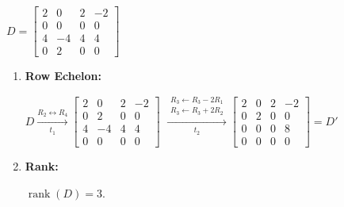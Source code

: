 $D=
\begin{bmatrix}
    2 & 0 & 2 & -2 \\
    0 & 0 & 0 & 0 \\
    4 & -4 & 4 & 4 \\
    0 & 2 & 0 & 0
\end{bmatrix}
$ \\[1.0em]

\begin{enumerate}
    \item
    \textbf{Row Echelon:} \\[1.0em]
    \begin{answer}
        $D \xrightarrow[t_1]{R_2 \leftrightarrow R_4}
        \begin{bmatrix}
            2 & 0 & 2 & -2 \\
            0 & 2 & 0 & 0 \\
            4 & -4 & 4 & 4 \\
            0 & 0 & 0 & 0
        \end{bmatrix}
        $
        $\xrightarrow[t_2]{
            \substack{
                R_3 \leftarrow R_3-2R_1 \\
                R_3 \leftarrow R_3+2R_2
            }
        }
        \begin{bmatrix}
            2 & 0 & 2 & -2 \\
            0 & 2 & 0 & 0 \\
            0 & 0 & 0 & 8 \\
            0 & 0 & 0 & 0
        \end{bmatrix}
        = D'$
    \end{answer}

    \item
    \textbf{Rank:}
    \begin{answer}
        $\operatorname{rank}(D)=3.$
    \end{answer} \\


\end{enumerate}
